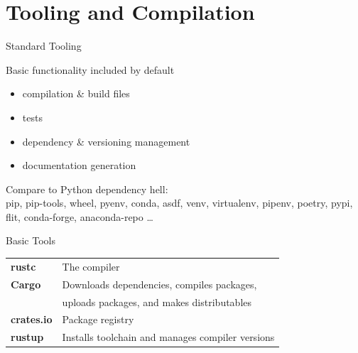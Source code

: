 \documentclass{beamer}
\begin{document}
\section{Tooling and Compilation} 


\begin{frame}{Standard Tooling} 
\vspace{-3em}
\begin{block}
{Basic functionality included by default}
\begin{itemize} [label=$\bullet$] 
\item compilation \& build files
\item tests
\item dependency \& versioning management
\item documentation generation
\end{itemize}
\end{block}
Compare to Python dependency hell: \\
pip, pip-tools, wheel, pyenv, conda, asdf, venv, virtualenv, pipenv, poetry, pypi, flit, conda-forge, anaconda-repo \ldots
\end{frame} 


\begin{frame}{Basic Tools} 
\begin{block}{}
\begin{tabular}{@{}l l@{}}
\textbf{rustc}        & The compiler \\
\textbf{Cargo}        & Downloads dependencies, compiles packages, 
\\ & uploads packages, and makes distributables\\
\textbf{crates.io}    & Package registry \\
\textbf{rustup}       & Installs toolchain and manages compiler versions \\
\end{tabular}
\end{block}
\end{frame}
\end{document}
